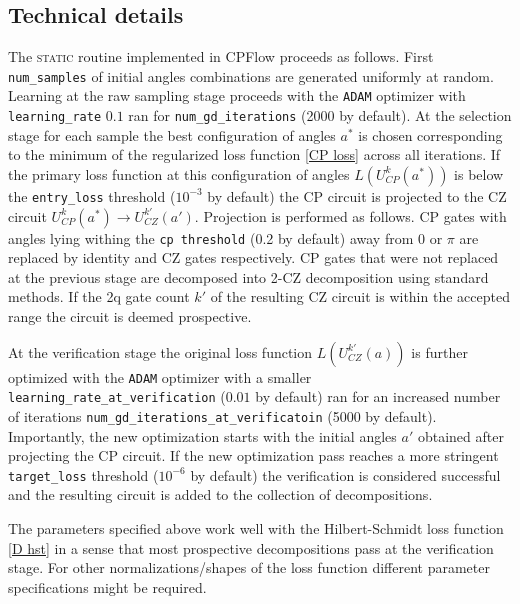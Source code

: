 \documentclass[amsfonts, amssymb, aps, nofootinbib, twocolumn]{revtex4-2}
\newcommand{\CZ}{CZ }
\newcommand{\CP}{CP }
\newcommand{\package}[1]{\textrm {#1 }}
\newcommand{\cpflow}{\package{CPFlow}}
\newcommand{\static}{\textsc{static }}
\newcommand{\param}[1]{\texttt{#1}}
\begin{document}
\subsection{Technical details \label{sec details}}
The \static routine implemented in \cpflow proceeds as follows.
First \param{num\_samples} of initial angles combinations are generated uniformly at random. Learning at the raw sampling stage proceeds with the \param{ADAM} optimizer with \param{learning\_rate} $0.1$ ran for \param{num\_gd\_iterations} (2000 by default).
At the selection stage for each sample the best configuration of angles $a^*$ is chosen corresponding to the minimum of the regularized loss function \eqref{CP loss} across all iterations. If the primary loss function at this configuration of angles $L(U_{CP}^k(a^*))$ is below the \param{entry\_loss} threshold ($10^{-3}$ by default) the \CP circuit is projected to the \CZ circuit $U_{CP}^k(a^*)\to U_{CZ}^{k'}(a')$. Projection is performed as follows. \CP gates with angles lying withing the \param{cp threshold}  (0.2 by default) away from $0$ or $\pi$ are replaced by identity and \CZ gates respectively.  \CP gates that were not replaced at the previous stage are decomposed into 2-\CZ decomposition using standard methods. If the 2q gate count $k'$ of the resulting \CZ circuit is within the accepted range the circuit is deemed prospective.

At the verification stage the original loss function $L(U_{CZ}^{k'}(a))$ is further optimized with the \param{ADAM} optimizer with a smaller \param{learning\_rate\_at\_verification} ($0.01$ by default) ran for an increased number of iterations \param{num\_gd\_iterations\_at\_verificatoin} (5000 by default). Importantly, the new optimization starts with the initial angles $a'$ obtained after projecting the \CP circuit. If the new optimization pass reaches a more stringent \param{target\_loss} threshold ($10^{-6}$ by default) the verification is considered successful and the resulting circuit is added to the collection of decompositions. 

The parameters specified above work well with the Hilbert-Schmidt loss function \eqref{D hst} in a sense that most prospective decompositions pass at the verification stage. For other normalizations/shapes of the loss function different parameter specifications might be required.
\end{document}
